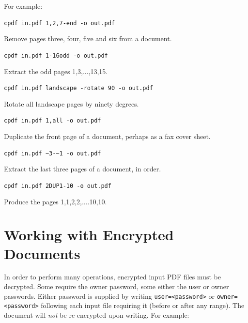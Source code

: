 \documentclass{book}
\begin{document}
  \noindent For example:
  \begin{framed}
  \noindent\small\verb!cpdf in.pdf 1,2,7-end -o out.pdf!

  \vspace{2.5mm}
  \noindent Remove pages three, four, five and six from a document.

  \vspace{2.5mm}
  \noindent\verb!cpdf in.pdf 1-16odd -o out.pdf!

  \vspace{2.5mm}
  \noindent Extract the odd pages 1,3,...,13,15.
  
  \vspace{2.5mm}
  \noindent\verb!cpdf in.pdf landscape -rotate 90 -o out.pdf!

  \vspace{2.5mm}
  \noindent Rotate all landscape pages by ninety degrees.
    
  \vspace{2.5mm}
  \noindent\verb!cpdf in.pdf 1,all -o out.pdf!

  \vspace{2.5mm}
  \noindent Duplicate the front page of a document, perhaps as a fax cover sheet.

  \vspace{2.5mm}
  \noindent\verb!cpdf in.pdf ~3-~1 -o out.pdf!

  \vspace{2.5mm}
  \noindent Extract the last three pages of a document, in order.

  \vspace{2.5mm}
  \noindent\verb!cpdf in.pdf 2DUP1-10 -o out.pdf!

  \vspace{2.5mm}
  \noindent Produce the pages 1,1,2,2,....10,10.

  \end{framed}

  \section{Working with Encrypted Documents}
  In order to perform many operations, encrypted input PDF files must be
decrypted. Some require the owner password, some either the user or owner
passwords. Either password is supplied by writing \texttt{user=<password>} or
\texttt{owner=<password>} following each input file requiring it (before or
after any range). The document will \textit{not} be re-encrypted upon writing.  For
example:
\end{document}
